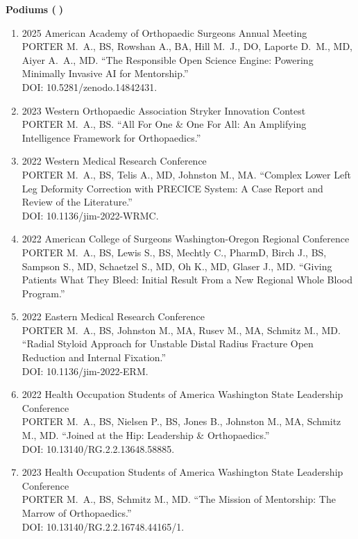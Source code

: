 \documentclass[9pt,a4paper]{article}
\newcommand{\emojiTalk}{{\emoji 🎤}}
\begin{document}
\vspace{0.4em}
\textbf{Podiums (\emojiTalk)}
\begin{enumerate}[leftmargin=*,resume]
  \item 2025 American Academy of Orthopaedic Surgeons Annual Meeting\\
  PORTER M.\ A., BS, Rowshan A., BA, Hill M.\ J., DO, Laporte D.\ M., MD, Aiyer A.\ A., MD. ``The Responsible Open Science Engine: Powering Minimally Invasive AI for Mentorship.''\\
  DOI: 10.5281/zenodo.14842431.

  \item 2023 Western Orthopaedic Association Stryker Innovation Contest\\
  PORTER M.\ A., BS. ``All For One \& One For All: An Amplifying Intelligence Framework for Orthopaedics.''

  \item 2022 Western Medical Research Conference\\
  PORTER M.\ A., BS, Telis A., MD, Johnston M., MA. ``Complex Lower Left Leg Deformity Correction with PRECICE System: A Case Report and Review of the Literature.''\\
  DOI: 10.1136/jim-2022-WRMC.

  \item 2022 American College of Surgeons Washington-Oregon Regional Conference\\
  PORTER M.\ A., BS, Lewis S., BS, Mechtly C., PharmD, Birch J., BS, Sampson S., MD, Schaetzel S., MD, Oh K., MD, Glaser J., MD. ``Giving Patients What They Bleed: Initial Result From a New Regional Whole Blood Program.''

  \item 2022 Eastern Medical Research Conference\\
  PORTER M.\ A., BS, Johnston M., MA, Rusev M., MA, Schmitz M., MD. ``Radial Styloid Approach for Unstable Distal Radius Fracture Open Reduction and Internal Fixation.''\\
  DOI: 10.1136/jim-2022-ERM.

  \item 2022 Health Occupation Students of America Washington State Leadership Conference\\
  PORTER M.\ A., BS, Nielsen P., BS, Jones B., Johnston M., MA, Schmitz M., MD. ``Joined at the Hip: Leadership \& Orthopaedics.''\\
  DOI: 10.13140/RG.2.2.13648.58885.

  \item 2023 Health Occupation Students of America Washington State Leadership Conference\\
  PORTER M.\ A., BS, Schmitz M., MD. ``The Mission of Mentorship: The Marrow of Orthopaedics.''\\
  DOI: 10.13140/RG.2.2.16748.44165/1.
\end{enumerate}
\end{document}
